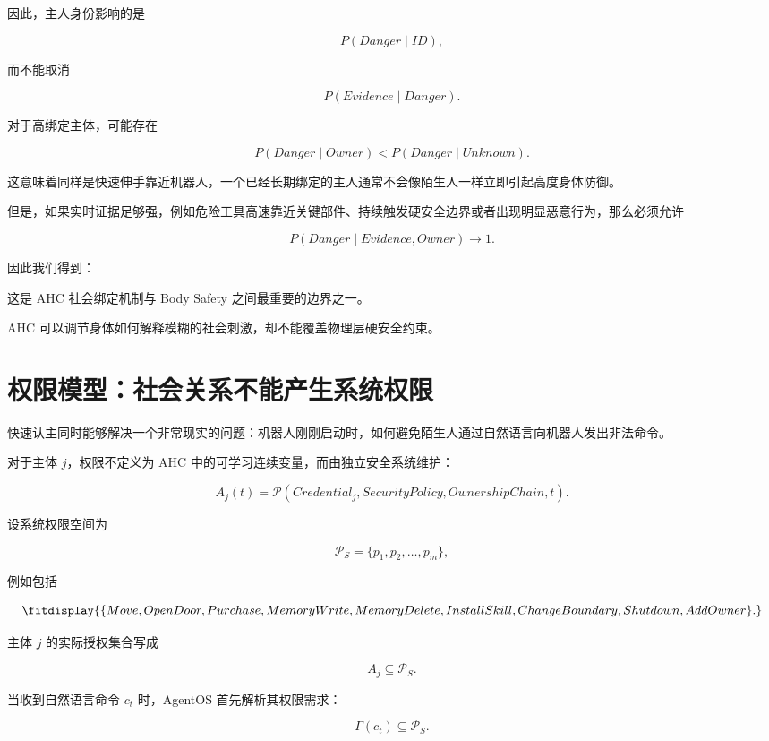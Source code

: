 因此，主人身份影响的是

\[
P(Danger\mid ID),
\]

而不能取消

\[
P(Evidence\mid Danger).
\]

对于高绑定主体，可能存在

\[
P(Danger\mid Owner)
<
P(Danger\mid Unknown).
\]

这意味着同样是快速伸手靠近机器人，一个已经长期绑定的主人通常不会像陌生人一样立即引起高度身体防御。

但是，如果实时证据足够强，例如危险工具高速靠近关键部件、持续触发硬安全边界或者出现明显恶意行为，那么必须允许

\[
P(Danger\mid Evidence,Owner)
\rightarrow 1.
\]

因此我们得到：

\begin{statementbox}
\centering
{}
\end{statementbox}

这是 AHC 社会绑定机制与 Body Safety 之间最重要的边界之一。

AHC 可以调节身体如何解释模糊的社会刺激，却不能覆盖物理层硬安全约束。


\section{权限模型：社会关系不能产生系统权限}

快速认主同时能够解决一个非常现实的问题：机器人刚刚启动时，如何避免陌生人通过自然语言向机器人发出非法命令。

对于主体 $j$，权限不定义为 AHC 中的可学习连续变量，而由独立安全系统维护：

\[
A_j(t)
=
\mathcal P
\left(
Credential_j,
SecurityPolicy,
OwnershipChain,
t
\right).
\]

设系统权限空间为

\[
\mathcal P_S
=
\{
p_1,p_2,\ldots,p_m
\},
\]

例如包括

\[
\fitdisplay{
\{
Move,
OpenDoor,
Purchase,
MemoryWrite,
MemoryDelete,
InstallSkill,
ChangeBoundary,
Shutdown,
AddOwner
\}.
}
\]

主体 $j$ 的实际授权集合写成

\[
A_j\subseteq\mathcal P_S.
\]

当收到自然语言命令 $c_t$ 时，AgentOS 首先解析其权限需求：

\[
\Gamma(c_t)
\subseteq
\mathcal P_S.
\]


